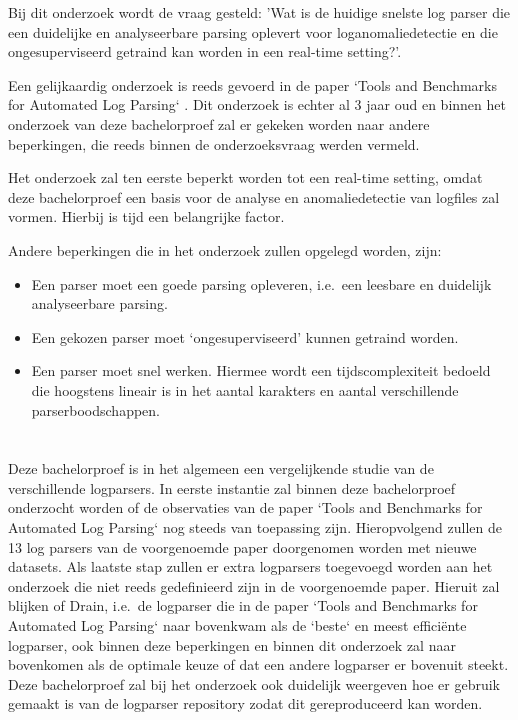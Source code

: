 Bij dit onderzoek wordt de vraag gesteld: 'Wat is de huidige snelste log parser die een duidelijke en analyseerbare parsing oplevert voor loganomaliedetectie en die ongesuperviseerd getraind kan worden in een real-time setting?'.

Een gelijkaardig onderzoek is reeds gevoerd in de paper `Tools and Benchmarks for Automated Log Parsing` \autocite{TBA2019}. Dit onderzoek is echter al 3 jaar oud en binnen het onderzoek van deze bachelorproef zal er gekeken worden naar andere beperkingen, die reeds binnen de onderzoeksvraag werden vermeld.

Het onderzoek zal ten eerste beperkt worden tot een real-time setting, omdat deze bachelorproef een basis voor de analyse en anomaliedetectie van logfiles zal vormen. Hierbij is tijd een belangrijke factor. 

Andere beperkingen die in het onderzoek zullen opgelegd worden, zijn:
\begin{itemize}
    \item Een parser moet een goede parsing opleveren, i.e.\ een leesbare en duidelijk analyseerbare parsing.
    \item Een gekozen parser moet ‘ongesuperviseerd’ kunnen getraind worden.
    \item Een parser moet snel werken. Hiermee wordt een tijdscomplexiteit bedoeld die hoogstens lineair is in het aantal karakters en aantal verschillende parserboodschappen.
\end{itemize}

\section{}
\label{sec:onderzoeksdoelstelling}


Deze bachelorproef is in het algemeen een vergelijkende studie van de verschillende logparsers. In eerste instantie zal binnen deze bachelorproef onderzocht worden of de observaties van de paper `Tools and Benchmarks for Automated Log Parsing` \autocite{TBA2019} nog steeds van toepassing zijn. Hieropvolgend zullen de 13 log parsers van de voorgenoemde paper doorgenomen worden met nieuwe datasets. Als laatste stap zullen er extra logparsers toegevoegd worden aan het onderzoek die niet reeds gedefinieerd zijn in de voorgenoemde paper. Hieruit zal blijken of Drain, i.e.\ de logparser die in de paper `Tools and Benchmarks for Automated Log Parsing` \autocite{TBA2019} naar bovenkwam als de `beste` en meest efficiënte logparser, ook binnen deze beperkingen en binnen dit onderzoek zal naar bovenkomen als de optimale keuze of dat een andere logparser er bovenuit steekt. Deze bachelorproef zal bij het onderzoek ook duidelijk weergeven hoe er gebruik gemaakt is van de logparser repository \autocite{TBA2019} zodat dit gereproduceerd kan worden. 

